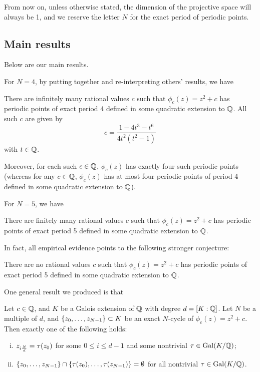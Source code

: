 From now on, unless otherwise stated, the dimension of the projective
space will always be 1, and we reserve the letter $N$ for the exact
period of periodic points.

\subsection{Main results}
\label{subsec:results}

Below are our main results.

For $N = 4$, by putting together and re-interpreting others' results,
we have

\begin{theorem}
  \label{th:n=4-infinite}
  There are infinitely many rational values $c$ such that $\phi_c(z) =
  z^2 + c$ has periodic points of exact period 4 defined in some
  quadratic extension to $\mathbb{Q}$. All such $c$ are given by
  \[
  c = \frac{1 - 4t^3 - t^6}{4t^2(t^2 - 1)}
  \]
  with $t \in \mathbb{Q}$.

  Moreover, for each such $c \in \mathbb{Q}$, $\phi_c(z)$ has exactly four
  such periodic points (whereas for any $c \in \mathbb{Q}$, $\phi_c(z)$ has
  at most four periodic points of period 4 defined in some quadratic
  extension to $\mathbb{Q}$).
\end{theorem}

For $N = 5$, we have

\begin{theorem}
  \label{th:n=5-finite}
  There are finitely many rational values $c$ such that $\phi_c(z) =
  z^2 + c$ has periodic points of exact period 5 defined in some
  quadratic extension to $\mathbb{Q}$.
\end{theorem}

In fact, all empirical evidence points to the following stronger
conjecture:

\begin{conjecture}
  \label{cj:n=5-zero}
  There are no rational values $c$ such that $\phi_c(z) = z^2 + c$ has
  periodic points of exact period 5 defined in some quadratic
  extension to $\mathbb{Q}$.
\end{conjecture}

One general result we produced is that

\begin{theorem}
  Let $c \in \mathbb{Q}$, and $K$ be a Galois extension of $\mathbb{Q}$ with degree $d
  = [K : \mathbb{Q}]$. Let $N$ be a multiple of $d$, and $\left\{z_0, \dots,
    z_{N-1}\right\} \subset K$ be an exact $N$-cycle of $\phi_c(z) = z^2 +
  c$. Then exactly one of the following holds:
  \begin{enumerate}[(i)]
  \item $z_{i\frac{N}{d}} = \tau(z_0)$ for some $0 \le i \le d-1$ and
    some nontrivial $\tau \in \mathrm{Gal}(K/\mathbb{Q})$;

  \item $\left\{z_0, \dots, z_{N-1}\right\} \cap \left\{\tau(z_0), \dots, \tau(z_{N-1})\right\} =
    \emptyset$ for all nontrivial $\tau \in \mathrm{Gal}(K/\mathbb{Q})$.
  \end{enumerate}
\end{theorem}

